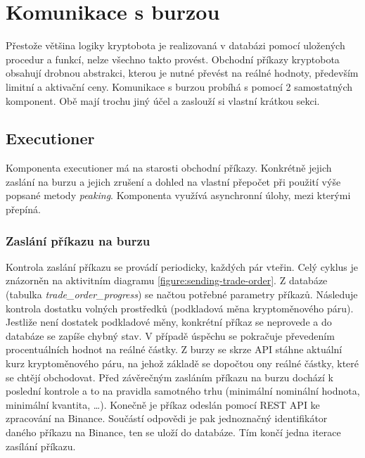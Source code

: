 \section{Komunikace s burzou}
\label{subsec:exchanges-comm}
Přestože většina logiky kryptobota je realizovaná v databázi pomocí uložených procedur a funkcí, nelze všechno takto provést. Obchodní příkazy kryptobota obsahují drobnou abstrakci, kterou je
nutné převést na reálné hodnoty, především limitní a aktivační ceny. Komunikace s burzou probíhá s pomocí 2 samostatných komponent. Obě mají trochu jiný účel a zaslouží si vlastní krátkou sekci.

\subsection{Executioner}
Komponenta executioner má na starosti obchodní příkazy. Konkrétně jejich zaslání na burzu a jejich zrušení a dohled na vlastní přepočet při použití výše popsané metody \emph{peaking}. Komponenta
využívá asynchronní úlohy, mezi kterými přepíná.

\subsubsection{Zaslání příkazu na burzu}
Kontrola zaslání příkazu se provádí periodicky, každých pár vteřin. Celý cyklus je znázorněn na aktivitním diagramu \ref{figure:sending-trade-order}.
Z databáze (tabulka \emph{trade\_order\_progress}) se načtou potřebné parametry příkazů. Následuje kontrola
dostatku volných prostředků (podkladová měna kryptoměnového páru). Jestliže není dostatek podkladové měny, konkrétní příkaz se neprovede a do databáze se zapíše chybný stav. V případě
úspěchu se pokračuje převedením procentuálních hodnot na reálné částky. Z burzy se skrze API stáhne aktuální kurz kryptoměnového páru, na jehož základě se dopočtou ony reálné částky, které
se chtějí obchodovat. Před závěrečným zasláním příkazu na burzu dochází k poslední kontrole a to na pravidla samotného trhu (minimální nominální hodnota, minimální kvantita, \ldots).
Konečně je příkaz odeslán pomocí REST API ke zpracování na Binance. Součástí odpovědi je pak jednoznačný identifikátor daného příkazu na Binance, ten se uloží do databáze. Tím končí jedna
iterace zasílání příkazu.



